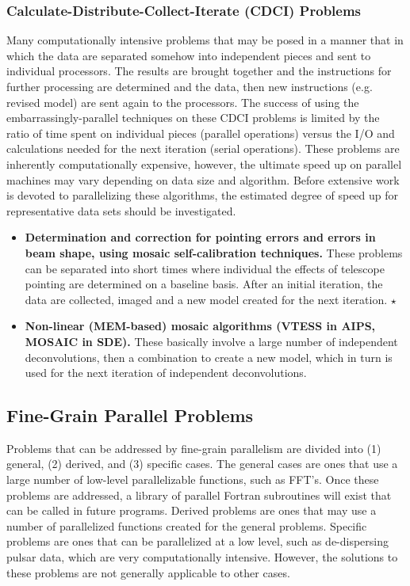 \subsubsection{Calculate-Distribute-Collect-Iterate (CDCI) Problems}

Many computationally intensive problems that may be posed in a manner
that in which the data are separated somehow into independent pieces
and sent to individual processors.  The results are brought together
and the instructions for further processing are determined and the
data, then new instructions (e.g. revised model) are sent again to the
processors.  The success of using the embarrassingly-parallel
techniques on these CDCI problems is limited by the ratio of time
spent on individual pieces (parallel operations) versus the I/O and
calculations needed for the next iteration (serial operations).  These
problems are inherently computationally expensive, however, the
ultimate speed up on parallel machines may vary depending on data size
and algorithm.  Before extensive work is devoted to parallelizing
these algorithms, the estimated degree of speed up for representative
data sets should be investigated.

\begin{itemize}

\item {\bf Determination and correction for pointing errors and errors
in beam shape, using mosaic self-calibration techniques.}  These
problems can be separated into short times where individual the
effects of telescope pointing are determined on a baseline basis.
After an initial iteration, the data are collected, imaged and a new
model created for the next iteration.  $\star$

\item {\bf Non-linear (MEM-based) mosaic algorithms (VTESS in AIPS,
MOSAIC in SDE).}  These basically involve a large number of
independent deconvolutions, then a combination to create a new model,
which in turn is used for the next iteration of independent
deconvolutions.

\end{itemize}

\subsection{Fine-Grain Parallel Problems}

Problems that can be addressed by fine-grain parallelism are divided
into (1) general, (2) derived, and (3) specific cases.  The general
cases are ones that use a large number of low-level parallelizable
functions, such as FFT's.  Once these problems are addressed, a
library of parallel Fortran subroutines will exist that can be called
in future programs.  Derived problems are ones that may use a number
of parallelized functions created for the general problems.  Specific
problems are ones that can be parallelized at a low level, such as
de-dispersing pulsar data, which are very computationally intensive.
However, the solutions to these problems are not generally applicable
to other cases.

